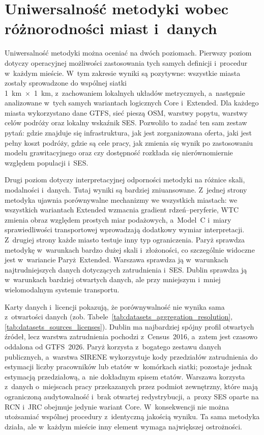 \documentclass{pracamgr}
\begin{document}
\section{Uniwersalność metodyki wobec różnorodności miast i~danych}\label{section:ch5_uniwersalnosc_metodyki}

Uniwersalność metodyki można oceniać na dwóch poziomach. Pierwszy poziom dotyczy operacyjnej możliwości zastosowania tych samych definicji i~procedur w~każdym mieście. W~tym zakresie wyniki są pozytywne: wszystkie miasta zostały sprowadzone do wspólnej siatki\\1~km~$\times$~1~km, z~zachowaniem lokalnych układów metrycznych, a~następnie analizowane w~tych samych wariantach logicznych \mbox{Core} i~\mbox{Extended}. Dla każdego miasta wykorzystano dane \mbox{GTFS}, sieć pieszą \mbox{OSM}, warstwy popytu, warstwy celów podróży oraz lokalny wskaźnik \mbox{SES}. Pozwoliło to zadać ten sam zestaw pytań: gdzie znajduje się infrastruktura, jak jest zorganizowana oferta, jaki jest pełny koszt podróży, gdzie są cele pracy, jak zmienia się wynik po zastosowaniu modelu grawitacyjnego oraz czy dostępność rozkłada się nierównomiernie względem populacji i~\mbox{SES}.

Drugi poziom dotyczy interpretacyjnej odporności metodyki na różnice skali, modalności i~danych. Tutaj wyniki są bardziej zniuansowane. Z~jednej strony metodyka ujawnia porównywalne mechanizmy we wszystkich miastach: we wszystkich wariantach \mbox{Extended} wzmacnia gradient rdzeń--peryferie, \mbox{WTC} zmienia obraz względem prostych miar podażowych, a~Model~C i~miary sprawiedliwości transportowej wprowadzają dodatkowy wymiar interpretacji. Z~drugiej strony każde miasto testuje inny typ ograniczenia. Paryż sprawdza metodykę w~warunkach bardzo dużej skali i~złożoności, co szczególnie widoczne jest w~wariancie \mbox{Paryż~Extended}. Warszawa sprawdza ją w~warunkach najtrudniejszych danych dotyczących zatrudnienia i~\mbox{SES}. Dublin sprawdza ją w~warunkach bardziej otwartych danych, ale przy mniejszym i~mniej wielomodalnym systemie transportu.

Karty danych i~licencji pokazują, że porównywalność nie wynika sama z~otwartości danych (zob. Tabele~\ref{tab:datasets_aggregation_resolution}, \ref{tab:datasets_sources_licenses}). Dublin ma najbardziej spójny profil otwartych źródeł, lecz warstwa zatrudnienia pochodzi z~\mbox{Census~2016}, a~zatem jest czasowo oddalona od \mbox{GTFS~2026}. Paryż korzysta z~bogatego zestawu danych publicznych, a~warstwa \mbox{SIRENE} wykorzystuje kody przedziałów zatrudnienia do estymacji liczby pracowników lub etatów w~komórkach siatki; pozostaje jednak estymacją przedziałową, a~nie dokładnym spisem etatów. Warszawa korzysta z~danych o~miejscach pracy przekazanych przez podmiot zewnętrzny, które mają ograniczoną audytowalność i~brak otwartej redystrybucji, a~proxy \mbox{SES} oparte na \mbox{RCN} i~\mbox{JRC} obejmuje jedynie wariant \mbox{Core}. W~konsekwencji nie można utożsamiać wspólnej procedury z~identyczną jakością wyniku. Ta sama metodyka działa, ale w~każdym mieście inny element wymaga największej ostrożności.
\end{document}
